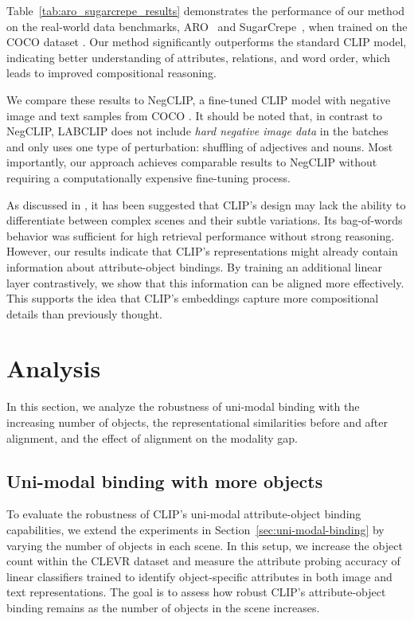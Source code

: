 Table~\ref{tab:aro_sugarcrepe_results} demonstrates the performance of our method on the real-world data benchmarks, ARO~\cite{Yuksekgonul2023} and SugarCrepe~\cite{hsieh2024sugarcrepe}, when trained on the COCO dataset \cite{lin2014coco}. Our method significantly outperforms the standard CLIP model, indicating better understanding of attributes, relations, and word order, which leads to improved compositional reasoning.

We compare these results to NegCLIP, a fine-tuned CLIP model with negative image and text samples from COCO \cite{Yuksekgonul2023}. It should be noted that, in contrast to NegCLIP, LABCLIP does not include \textit{hard negative image data} in the batches and only uses one type of perturbation: shuffling of adjectives and nouns. Most importantly, our approach achieves comparable results to NegCLIP without requiring a computationally expensive fine-tuning process.


As discussed in \cite{Yuksekgonul2023}, it has been suggested that CLIP’s design may lack the ability to differentiate between complex scenes and their subtle variations. Its bag-of-words behavior was sufficient for high retrieval performance without strong reasoning. However, our results indicate that CLIP’s representations might already contain information about attribute-object bindings. By training an additional linear layer contrastively, we show that this information can be aligned more effectively. This supports the idea that CLIP’s embeddings capture more compositional details than previously thought.



     


\section{Analysis}

In this section, we analyze the robustness of uni-modal binding with the increasing number of objects, the representational similarities before and after alignment, and the effect of alignment on the modality gap.






\subsection{Uni-modal binding with more objects}
\label{sec:more_objects}

To evaluate the robustness of CLIP’s uni-modal attribute-object binding capabilities, we extend the experiments in Section~\ref{sec:uni-modal-binding} by varying the number of objects in each scene. In this setup, we increase the object count within the CLEVR dataset and measure the attribute probing accuracy of linear classifiers trained to identify object-specific attributes in both image and text representations. The goal is to assess how robust CLIP’s attribute-object binding remains as the number of objects in the scene increases.


